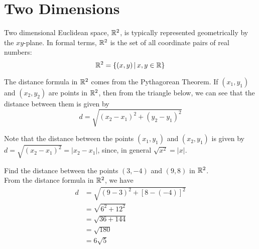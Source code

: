 \documentclass[handout]{ximera}
\begin{document}
\section{Two Dimensions}
Two dimensional Euclidean space, $\mathbb R^2$, is typically represented geometrically by the $xy$-plane. 
In formal terms, $\mathbb R^2$ is the set of all coordinate pairs of real numbers:
 \[
\mathbb R^2 = \{(x,y) \,|\, x, y \in \mathbb R\}
\]

The distance formula in $\mathbb R^2$ comes from the Pythagorean Theorem. If $(x_1, y_1)$ and $(x_2, y_2)$ are points in $\mathbb R^2$, then from the triangle below,
we can see that the distance between them is given by 
\[
d = \sqrt{(x_2 - x_1)^2 + (y_2 - y_1)^2}
\]



\begin{image}
\end{image}
Note that the distance between the points $(x_1, y_1)$ and $(x_2, y_1)$ is given by 
$d = \sqrt{(x_2-x_1)^2} = |x_2 -x_1|$, since, in general $\sqrt{x^2} = |x|$.

\begin{example}[Example 2]
Find the distance between the points $(3,-4)$ and $(9,8)$ in $\mathbb R^2$.\\
From the distance formula in $\mathbb R^2$, we have
\begin{align*}
d &= \sqrt{(9-3)^2 + [8-(-4)]^2}\\
  &= \sqrt{6^2 + 12^2}\\
  & = \sqrt{36 +144}\\
  &= \sqrt{180}\\
  &= 6\sqrt 5
\end{align*}
\end{example}
\end{document}
